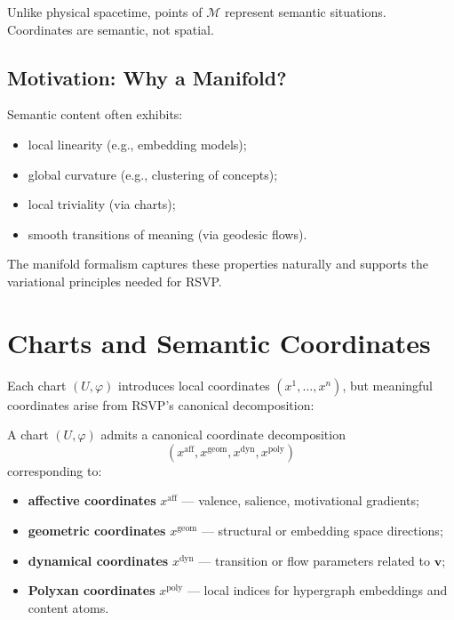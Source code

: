Unlike physical spacetime, points of $\mathcal{M}$ represent semantic
situations. Coordinates are semantic, not spatial.

\subsection{Motivation: Why a Manifold?}

Semantic content often exhibits:
\begin{itemize}
  \item local linearity (e.g., embedding models);
  \item global curvature (e.g., clustering of concepts);
  \item local triviality (via charts);
  \item smooth transitions of meaning (via geodesic flows).
\end{itemize}

The manifold formalism captures these properties naturally and supports the
variational principles needed for RSVP.

\section{Charts and Semantic Coordinates}

Each chart $(U,\varphi)$ introduces local coordinates
$ (x^1, \dots, x^n) $, but meaningful coordinates arise from RSVP’s canonical
decomposition:

\begin{definition}
A chart $(U,\varphi)$ admits a canonical coordinate decomposition
\[
(x^\mathrm{aff}, x^\mathrm{geom},
  x^\mathrm{dyn}, x^\mathrm{poly})
\]
corresponding to:
\begin{itemize}
  \item \textbf{affective coordinates} $x^\mathrm{aff}$ — valence, salience,
        motivational gradients;
  \item \textbf{geometric coordinates} $x^\mathrm{geom}$ — structural or
        embedding space directions;
  \item \textbf{dynamical coordinates} $x^\mathrm{dyn}$ — transition or flow
        parameters related to $\mathbf{v}$;
  \item \textbf{Polyxan coordinates} $x^\mathrm{poly}$ — local indices for
        hypergraph embeddings and content atoms.
\end{itemize}
\]
\end{definition}

